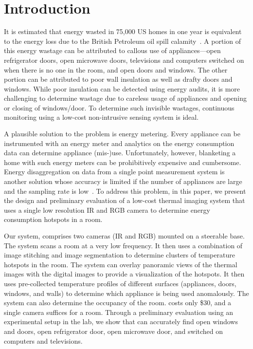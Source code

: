 \section{Introduction}
\label{sec:intro}

It is estimated that energy wasted in 75,000 US homes in one year is equivalent to the energy loss due to the British Petroleum oil
spill calamity~\cite{XX}. A portion of this energy wastage can be attributed to callous use of appliances---open refrigerator doors,
open microwave doors, televisions and computers switched on when there is no one in the room, and open doors and windows. The other
portion can be attributed to poor wall insulation as well as drafty doors and windows. While poor insulation can be detected using
energy audits, it is more challenging to determine wastage due to careless usage of appliances and opening or closing of windows/door.
To determine such invisible wastages, continuous monitoring using a low-cost non-intrusive sensing system is ideal.

A plausible solution to the problem is energy metering. Every appliance can be instrumented with an energy meter and analytics on the
energy consumption data can determine appliance (mis-)use. Unfortunately, however, blanketing a home with such energy meters can be
prohibitively expensive and cumbersome. Energy disaggregation on data from a single point measurement system is another solution 
whose accuracy is limited if the number of appliances are large and the sampling rate is low~\cite{XX}. To address this problem, in
this paper, we present the design and preliminary evaluation of a low-cost thermal imaging system that uses a single low resolution IR
and RGB camera to determine energy consumption hotspots in a room.

Our system, {\IRLeak} comprises two cameras (IR and RGB) mounted on a steerable base. The system scans a room at a very low frequency.
It then uses a combination of image stitching and image segmentation to determine clusters of temperature hotspots in the room. The
system can overlay panoramic views of the thermal images with the digital images to provide a visualization of the hotspots. It then
uses pre-collected temperature profiles of different surfaces (appliances, doors, windows, and walls) to determine which appliance is
being used anomalously. The system can also determine the occupancy of the room. {\IRLeak} costs only \$30, and a single camera
suffices for a room. Through a preliminary evaluation using an experimental setup in the lab, we show that {\IRLeak} can accurately
find open windows and doors, open refrigerator door, open microwave door, and switched on computers and televisions. 


